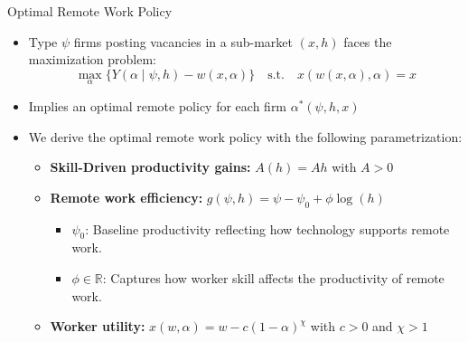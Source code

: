 \documentclass[aspectratio=1610]{beamer}
\begin{document}
\begin{frame}{Optimal Remote Work Policy}
    \begin{itemize}
        \item Type $\psi$ firms posting vacancies in a sub-market $(x,h)$ faces the maximization problem:\[\max_{\alpha} \{ Y(\alpha \mid \psi, h) - w(x,\alpha)\}\quad\text{s.t.}\quad x(w(x,\alpha), \alpha) = x\]\pause
        \item Implies an optimal remote policy for each firm $\alpha^*(\psi, h, x)$ \pause \vspace{0.3cm} 
        \item We derive the optimal remote work policy with the following parametrization:\pause \vspace{0.1cm}
        \begin{itemize}
            \item \textbf{Skill-Driven productivity gains:} $A(h) = A h$ with $A > 0$ \pause \vspace{0.1cm}
            \item \textbf{Remote work efficiency:} $g(\psi, h) = \psi - \psi_0 + \phi \log(h)$ 
            \begin{itemize}
                \item $\psi_0$: Baseline productivity reflecting how technology supports remote work. 
                \item $\phi \in \mathbb{R}$: Captures how worker skill affects the productivity of remote work.
            \end{itemize}\pause \vspace{0.1cm}
            \item \textbf{Worker utility:} $x(w,\alpha)= w - c (1 - \alpha)^{\chi}$ with \( c > 0 \) and \( \chi > 1 \)
        \end{itemize}
        
    \end{itemize}  
\end{frame}
\end{document}

